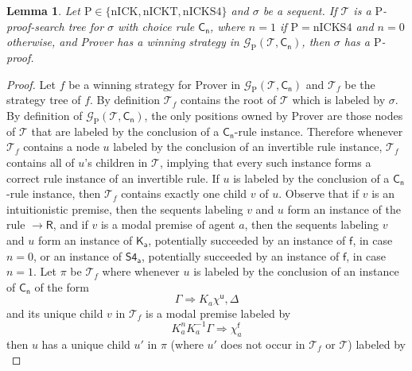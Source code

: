 \documentclass{myifcolog}
\newcommand{\K}{K}
\newcommand{\agi}{a}
\newcommand{\f}{\mathsf{f}}
\renewcommand{\u}{\mathsf{u}}
\newcommand{\hickp}{\mathrm{P}}
\newcommand{\nick}{\mathrm{nICK}}
\newcommand{\nickt}{\mathrm{nICKT}}
\newcommand{\nicks}{\mathrm{nICKS4}}
\newtheorem{lemma}[theorem]{Lemma}
\numberwithin{theorem}{section}
\begin{document}
\begin{lemma}\label{lem WS for P with Ct correspond to proofs}
     Let $\hickp \in \{\nick, \nickt, \nicks\}$ and $\sigma$ be a sequent. If $\mathcal{T}$ is a $\hickp$-proof-search tree for $\sigma$ with choice rule $\mathsf{C_n}$, where $n=1$ if $\hickp = \nicks$ and $n=0$ otherwise, and Prover has a winning strategy in $\mathcal{G}_\hickp(\mathcal{T}, \mathsf{C_n})$, then $\sigma$ has a $\hickp$-proof. 
 \end{lemma}
 
 \begin{proof}
     Let $f$ be a winning strategy for Prover in $\mathcal{G}_\hickp(\mathcal{T}, \mathsf{C_n})$ and $\mathcal{T}_f$ be the strategy tree of $f$. By definition $\mathcal{T}_f$ contains the root of  $\mathcal{T}$ which is labeled by $\sigma$. By definition of $\mathcal{G}_\hickp(\mathcal{T}, \mathsf{C_n})$, the only positions owned by Prover are those nodes of $\mathcal{T}$ that are labeled by the conclusion of a $\mathsf{C_n}$-rule instance. Therefore whenever $\mathcal{T}_f$ contains a node $u$ labeled by the conclusion of an invertible rule instance, $\mathcal{T}_f$ contains all of $u$'s children in $\mathcal{T}$, implying that every such instance forms a correct rule instance of an invertible rule. If $u$ is labeled by the conclusion of a $\mathsf{C_n}$-rule instance, then $\mathcal{T}_f$ contains exactly one child $v$ of $u$. Observe that if $v$ is an intuitionistic premise, then the sequents labeling $v$ and $u$ form an instance of the rule ${\rightarrow}\mathsf{R}$, and if $v$ is a modal premise of agent $\agi$, then the sequents labeling $v$ and $u$ form an instance of $\mathsf{\K_\agi}$, potentially succeeded by an instance of $\mathsf{f}$, in case $n=0$, or an instance of $\mathsf{S4_\agi}$, potentially succeeded by an instance of $\mathsf{f}$, in case $n=1$. Let $\pi$ be $\mathcal{T}_f$ where whenever $u$ is labeled by the conclusion of an instance of $\mathsf{C_n}$ of the form
     \begin{equation*}
         \Gamma \Rightarrow \K_\agi \chi^\u, \Delta
     \end{equation*}
    and its unique child $v$ in $\mathcal{T}_f$ is a modal premise labeled by
     \begin{equation*}
         \K_\agi^n\K_\agi^{-1} \Gamma \Rightarrow \chi_\agi^\f
     \end{equation*}
    then $u$ has a unique child $u'$ in $\pi$ (where $u'$ does not occur in $\mathcal{T}_f$ or $\mathcal{T}$) labeled by
     \begin{equation*}

\end{equation*}
\end{proof}
\end{document}
